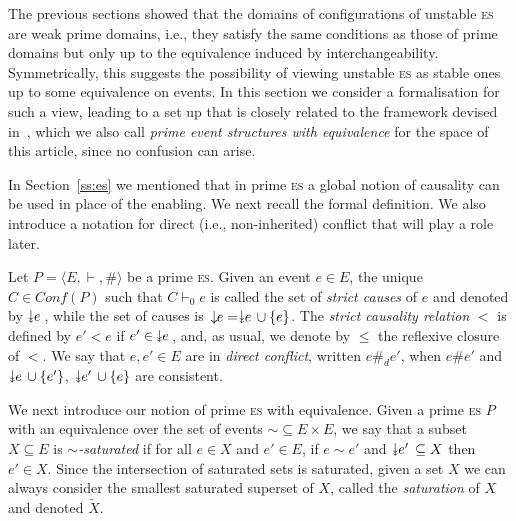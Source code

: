 \documentclass[conference]{IEEEtran}
\newcommand{\esabbr}{\textsc{es}}
\newcommand{\conf}[1]{\ensuremath{\mathit{Conf}({#1})}}
\newcommand\twoheaddownarrow{\mathrel{\raisebox{0.8\depth}{\rotatebox{270}{$\twoheadrightarrow$}}}}
\newcommand{\scauses}[1]{\ensuremath{\twoheaddownarrow\!\!{#1}\,}}
\newcommand{\causes}[1]{\ensuremath{\,\downarrow\!\!{#1}}}
\newcommand{\sat}[1]{\ensuremath{\tilde{#1}}}
\begin{document}
The previous sections showed that the domains of configurations of
unstable {\esabbr} are weak prime domains, i.e., they satisfy the same
conditions as those of prime domains but only up to the equivalence
induced by interchangeability.
%
Symmetrically, this suggests the possibility of viewing unstable
{\esabbr} as stable ones up to some equivalence on events.
%
In this section we consider a formalisation for such a view,
leading to a set up that is closely related to the framework devised
in~\cite{win2017,VismeW19},
which we also call \emph{prime event structures with equivalence}
for the space of this article, since no confusion can arise.

In Section~\ref{ss:es} we mentioned that in prime {\esabbr} a global
notion of causality can be used in place of the enabling. We next
recall the formal definition. We also introduce a notation for direct
(i.e., non-inherited) conflict that will play a role later.

\begin{definition}
  Let $P = \langle E, \vdash, \# \rangle$ be a prime {\esabbr}.  Given
  an event $e \in E$, the unique $C \in \conf{P}$ such that
  $C \vdash_0 e$ is called the set of \emph{strict causes} of $e$ and
  denoted by $\scauses{e}$, while the set of causes is
  $\causes{e} = \scauses{e} \cup \{e\}$. The \emph{strict causality
    relation} $<$ is defined by $e' < e$ if $e' \in\, \scauses{e}$,
  and, as usual, we denote by $\leq$ the reflexive closure of $<$. We
  say that $e, e' \in E$ are in \emph{direct conflict}, written
  $e \#_d e'$, when $e \# e'$ and $\scauses{e} \cup \{e'\}$,
  $\scauses{e'} \cup \{e\}$ are consistent.
\end{definition}

We next introduce our notion of prime {\esabbr} with
equivalence. Given a prime {\esabbr} $P$ with an equivalence over the
set of events ${\sim}\subseteq E \times E$, we say that a subset
$X \subseteq E$ is \emph{$\sim$-saturated} if for all $e \in X$ and
$e' \in E$, if $e \sim e'$ and $\scauses{e'} \subseteq X$  then
$e' \in X$. Since the intersection of saturated sets is saturated, given a set $X$ we can always consider the smallest saturated superset of $X$, called the  \emph{saturation} of $X$ and denoted $\sat{X}$.
\end{document}
